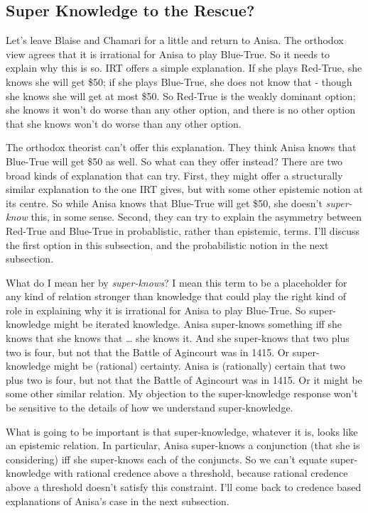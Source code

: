 \documentclass[
  11pt,
]{book}
\begin{document}
\hypertarget{superknow}{%
\subsection{Super Knowledge to the Rescue?}\label{superknow}}

Let's leave Blaise and Chamari for a little and return to Anisa. The orthodox view agrees that it is irrational for Anisa to play Blue-True. So it needs to explain why this is so. IRT offers a simple explanation. If she plays Red-True, she knows she will get \$50; if she plays Blue-True, she does not know that - though she knows she will get at most \$50. So Red-True is the weakly dominant option; she knows it won't do worse than any other option, and there is no other option that she knows won't do worse than any other option.

The orthodox theorist can't offer this explanation. They think Anisa knows that Blue-True will get \$50 as well. So what can they offer instead? There are two broad kinds of explanation that can try. First, they might offer a structurally similar explanation to the one IRT gives, but with some other epistemic notion at its centre. So while Anisa knows that Blue-True will get \$50, she doesn't \emph{super-know} this, in some sense. Second, they can try to explain the asymmetry between Red-True and Blue-True in probablistic, rather than epistemic, terms. I'll discuss the first option in this subsection, and the probabilistic notion in the next subsection.

What do I mean her by \emph{super-knows}? I mean this term to be a placeholder for any kind of relation stronger than knowledge that could play the right kind of role in explaining why it is irrational for Anisa to play Blue-True. So super-knowledge might be iterated knowledge. Anisa super-knows something iff she knows that she knows that \ldots{} she knows it. And she super-knows that two plus two is four, but not that the Battle of Agincourt was in 1415. Or super-knowledge might be (rational) certainty. Anisa is (rationally) certain that two plus two is four, but not that the Battle of Agincourt was in 1415. Or it might be some other similar relation. My objection to the super-knowledge response won't be sensitive to the details of how we understand super-knowledge.

What is going to be important is that super-knowledge, whatever it is, looks like an epistemic relation. In particular, Anisa super-knows a conjunction (that she is considering) iff she super-knows each of the conjuncts. So we can't equate super-knowledge with rational credence above a threshold, because rational credence above a threshold doesn't satisfy this constraint. I'll come back to credence based explanations of Anisa's case in the next subsection.
\end{document}
